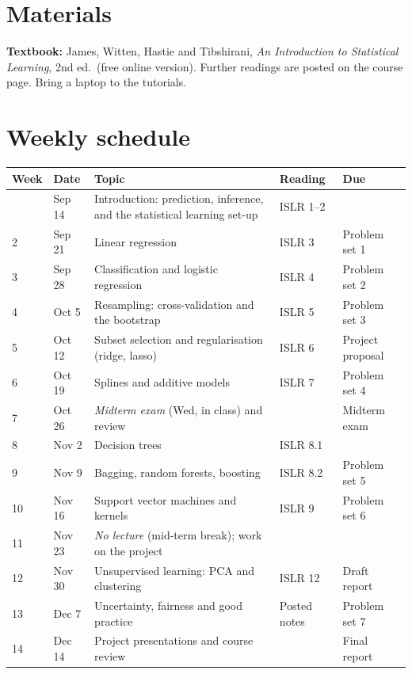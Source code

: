 \documentclass[11pt,a4paper]{article}
\begin{document}
\section{Materials}
\textbf{Textbook:} James, Witten, Hastie and Tibshirani, \emph{An Introduction to
Statistical Learning}, 2nd ed.\ (free online version). Further readings are posted on the
course page. Bring a laptop to the tutorials.

\section{Weekly schedule}
\begin{xltabular}{\textwidth}{@{}C{1.1cm}C{1.5cm}L>{\raggedright\arraybackslash}p{2.1cm}>{\raggedright\arraybackslash}p{3.0cm}@{}}
  \toprule
  \textbf{Week} & \textbf{Date} & \textbf{Topic} & \textbf{Reading} & \textbf{Due} \\
  \midrule
  \endhead
  \bottomrule
   & Sep 14 & Introduction: prediction, inference, and the statistical learning set-up & ISLR 1--2 & \\
   2 & Sep 21 & Linear regression & ISLR 3 & Problem set 1 \\
   3 & Sep 28 & Classification and logistic regression & ISLR 4 & Problem set 2 \\
   4 & Oct 5  & Resampling: cross-validation and the bootstrap & ISLR 5 & Problem set 3 \\
   5 & Oct 12 & Subset selection and regularisation (ridge, lasso) & ISLR 6 & Project proposal \\
   6 & Oct 19 & Splines and additive models & ISLR 7 & Problem set 4 \\
   7 & Oct 26 & \emph{Midterm exam} (Wed, in class) and review & & Midterm exam \\
   8 & Nov 2  & Decision trees & ISLR 8.1 & \\
   9 & Nov 9  & Bagging, random forests, boosting & ISLR 8.2 & Problem set 5 \\
  10 & Nov 16 & Support vector machines and kernels & ISLR 9 & Problem set 6 \\
  11 & Nov 23 & \emph{No lecture} (mid-term break); work on the project & & \\
  12 & Nov 30 & Unsupervised learning: PCA and clustering & ISLR 12 & Draft report \\
  13 & Dec 7  & Uncertainty, fairness and good practice & Posted notes & Problem set 7 \\
  14 & Dec 14 & Project presentations and course review & & Final report \\
\end{xltabular}
\end{document}
